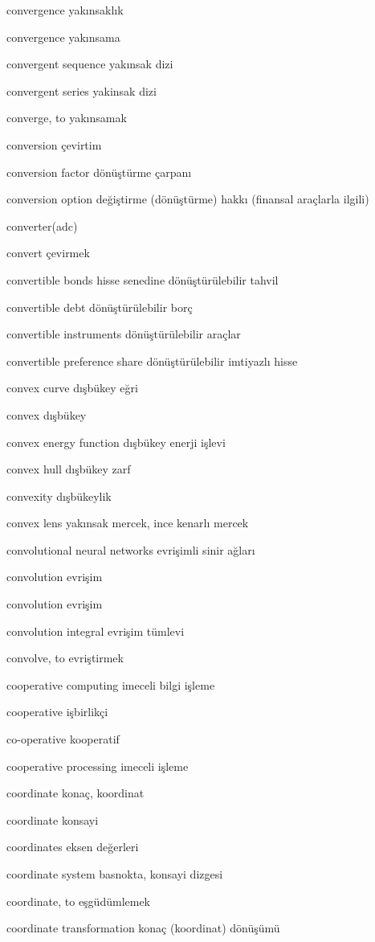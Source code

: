 \documentclass[12pt,fleqn]{article}\usepackage{../../common}
\begin{document}
convergence yakınsaklık

convergence yakınsama

convergent sequence yakınsak dizi

convergent series yakinsak dizi

converge, to yakınsamak

conversion çevirtim

conversion factor dönüştürme çarpanı

conversion option değiştirme (dönüştürme) hakkı (finansal araçlarla ilgili)

converter(adc)

convert çevirmek

convertible bonds hisse senedine dönüştürülebilir tahvil

convertible debt dönüştürülebilir borç

convertible instruments dönüştürülebilir araçlar

convertible preference share dönüştürülebilir imtiyazlı hisse

convex curve dışbükey eğri

convex dışbükey

convex energy function dışbükey enerji işlevi

convex hull dışbükey zarf

convexity dışbükeylik

convex lens yakınsak mercek, ince kenarlı mercek

convolutional neural networks evrişimli sinir ağları

convolution evrişim

convolution evrişim

convolution integral evrişim tümlevi

convolve, to evriştirmek

cooperative computing imeceli bilgi işleme

cooperative işbirlikçi

co-operative kooperatif

cooperative processing imeceli işleme

coordinate konaç, koordinat

coordinate konsayi

coordinates eksen değerleri

coordinate system basnokta, konsayi dizgesi

coordinate, to eşgüdümlemek

coordinate transformation konaç (koordinat) dönüşümü
\end{document}
